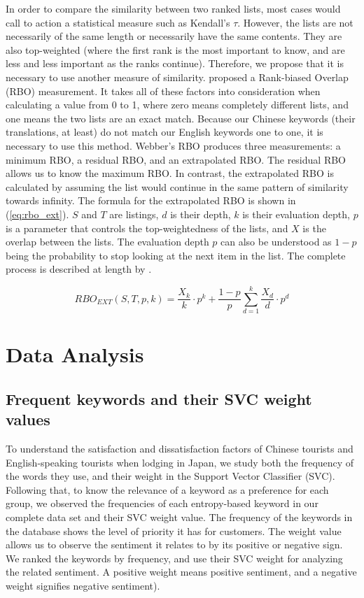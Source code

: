 \documentclass[smallextended,natbib]{svjour3}       %
\begin{document}
In order to compare the similarity between two ranked lists, most cases would call to action a statistical measure such as Kendall's \(\tau\). However, the lists are not necessarily of the same length or necessarily have the same contents. They are also top-weighted (where the first rank is the most important to know, and are less and less important as the ranks continue). Therefore, we propose that it is necessary to use another measure of similarity. \cite{webber2010similarity} proposed a Rank-biased Overlap (RBO) measurement. It takes all of these factors into consideration when calculating a value from 0 to 1, where zero means completely different lists, and one means the two lists are an exact match. Because our Chinese keywords (their translations, at least) do not match our English keywords one to one, it is necessary to use this method. Webber's RBO produces three measurements: a minimum RBO, a residual RBO, and an extrapolated RBO.
The residual RBO allows us to know the maximum RBO. In contrast, the extrapolated RBO is calculated by assuming the list would continue in the same pattern of similarity towards infinity. The formula for the extrapolated RBO is shown in (\ref{eq:rbo_ext}). \(S\) and \(T\) are listings, \(d\) is their depth, \(k\) is their evaluation depth, \(p\) is a parameter that controls the top-weightedness of the lists, and \(X\) is the overlap between the lists. The evaluation depth \(p\) can also be understood as \(1-p\) being the probability to stop looking at the next item in the list. The complete process is described at length by \cite{webber2010similarity}.

\begin{equation}\label{eq:rbo_ext}
RBO_{EXT}(S,T,p,k) = \frac{X_k}{k} \cdot p^k + \frac{1-p}{p} \sum_{d=1}^k{\frac{X_d}{d} \cdot p^d}
\end{equation}

\section{Data Analysis}\label{dataanalysis}

\subsection{Frequent keywords and their SVC weight values}\label{svmresults}

To understand the satisfaction and dissatisfaction factors of Chinese tourists and English-speaking tourists when lodging in Japan, we study both the frequency of the words they use, and their weight in the Support Vector Classifier (SVC). Following that, to know the relevance of a keyword as a preference for each group, we observed the frequencies of each entropy-based keyword in our complete data set and their SVC weight value. The frequency of the keywords in the database shows the level of priority it has for customers. The weight value allows us to observe the sentiment it relates to by its positive or negative sign. We ranked the keywords by frequency, and use their SVC weight for analyzing the related sentiment. A positive weight means positive sentiment, and a negative weight signifies negative sentiment). 
\end{document}
